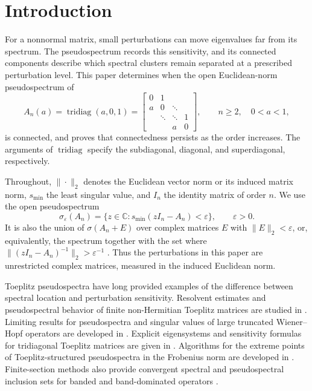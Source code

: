 \documentclass[preprints,article,accept,oneauthor]{Definitions/mdpi}
\numberwithin{equation}{section}
\newcounter{result}[section]
\theoremstyle{mdpi}
\theoremstyle{definition}
\DeclareMathOperator{\tridiag}{tridiag}
\newcommand{\C}{\mathbb C}
\begin{document}

\section{Introduction}
\label{sec:introduction}

For a nonnormal matrix, small perturbations can move eigenvalues far from
its spectrum.  The pseudospectrum records this sensitivity, and its
connected components describe which spectral clusters remain separated
at a prescribed perturbation level.  This paper determines when the open
Euclidean-norm pseudospectrum of
\begin{equation}\label{eq:canonical-matrix}
 A_n(a)=\tridiag(a,0,1)
 =\begin{bmatrix}
 0&1\\
 a&0&\ddots\\
 &\ddots&\ddots&1\\
 &&a&0
 \end{bmatrix},\qquad n\geq2,\quad 0<a<1,
\end{equation}
is connected, and proves that connectedness persists as the order increases.
The arguments of \(\tridiag\) specify the subdiagonal, diagonal, and
superdiagonal, respectively.

Throughout, \(\|\cdot\|_2\) denotes the Euclidean vector norm or its induced
matrix norm, \(s_{\min}\) the least singular value, and \(I_n\) the identity
matrix of order \(n\).  We use the open pseudospectrum
\begin{equation}\label{eq:intro-pseudospectrum}
 \sigma_\varepsilon(A_n)
 =\{z\in\C:s_{\min}(zI_n-A_n)<\varepsilon\},\qquad\varepsilon>0.
\end{equation}
It is also the union of \(\sigma(A_n+E)\) over complex matrices
\(E\) with \(\|E\|_2<\varepsilon\), or, equivalently, the spectrum together
with the set where \(\|(zI_n-A_n)^{-1}\|_2>\varepsilon^{-1}\)
\cite{Trefethen1997}.  Thus the perturbations in this paper are unrestricted
complex matrices, measured in the induced Euclidean norm.

Toeplitz pseudospectra have long provided examples of the difference between
spectral location and perturbation sensitivity.  Resolvent estimates and
pseudospectral behavior of finite non-Hermitian Toeplitz matrices are studied
in \cite{ReichelTrefethen1992}.  Limiting results for pseudospectra and singular
values of large truncated Wiener--Hopf operators are developed in \cite{Bottcher1994}.  Explicit eigensystems and sensitivity
formulas for tridiagonal Toeplitz matrices are given in
\cite{NoschesePasquiniReichel2013}.  Algorithms for the extreme points of
Toeplitz-structured pseudospectra in the Frobenius norm are developed in
\cite{ButtaGuglielmiNoschese2012}.  Finite-section methods also provide
convergent spectral and pseudospectral inclusion sets for banded and
band-dominated operators \cite{ChandlerWildeEtAl2024}.
\end{document}
